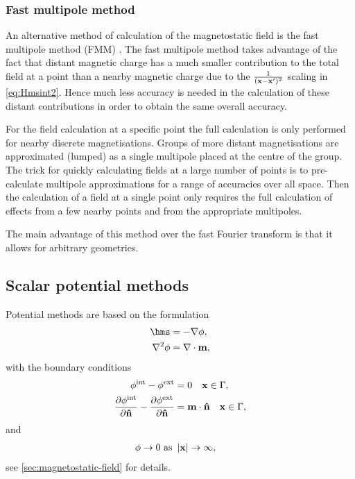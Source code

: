\subsubsection{Fast multipole method}
\label{sec:fast-mult-meth}

An alternative method of calculation of the magnetostatic field is the fast multipole method (FMM) \cite{Beatson1997}.
The fast multipole method takes advantage of the fact that distant magnetic charge has a much smaller contribution to the total field at a point than a nearby magnetic charge due to the $\frac{1}{(\boldsymbol{\mathrm{x}} - \boldsymbol{\mathrm{x}}')^2}$ scaling in \cref{eq:Hmsint2}.
Hence much less accuracy is needed in the calculation of these distant contributions in order to obtain the same overall accuracy.

For the field calculation at a specific point the full calculation is only performed for nearby discrete magnetisations.
Groups of more distant magnetisations are approximated (lumped) as a single multipole placed at the centre of the group.
The trick for quickly calculating fields at a large number of points is to pre-calculate multipole approximations for a range of accuracies over all space.
Then the calculation of a field at a single point only requires the full calculation of effects from a few nearby points and from the appropriate multipoles.

The main advantage of this method over the fast Fourier transform is that it allows for arbitrary geometries.


\subsection{Scalar potential methods}
\label{sec:magstat-field-calc-pote}

Potential methods are based on the formulation
\begin{equation}
  \begin{aligned}
    \label{eq:Hms2}
    \hms &= - \grad \phim, \\
    \lap \phim &= \div \mv,
  \end{aligned}
\end{equation}
with the boundary conditions
\begin{equation}
  \begin{aligned}
    \label{eq:cont-phi-bound2}
    \phi^{\mathrm{int}} - \phi^{\mathrm{ext}} &= 0 \quad \boldsymbol{\mathrm{x}} \in {\Gamma}, \\
    \frac{\partial \phi^{\mathrm{int}}}{\partial \boldsymbol{\mathrm{\hat{n}}}} - \frac{\partial \phi^{\mathrm{ext}}}{\partial \boldsymbol{\mathrm{\hat{n}}}} &= \boldsymbol{\mathrm{m}} \cdot \boldsymbol{\mathrm{\hat{n}}} \quad \boldsymbol{\mathrm{x}} \in {\Gamma}, \\
  \end{aligned}
\end{equation}
and
\begin{equation}
  \begin{aligned}
    \label{eq:phi-inf-bound}
    \phi \rightarrow 0 \text{ as } &\left|{\boldsymbol{\mathrm{x}}} \right| \rightarrow \infty,
  \end{aligned}
\end{equation}
see \cref{sec:magnetostatic-field} for details.

